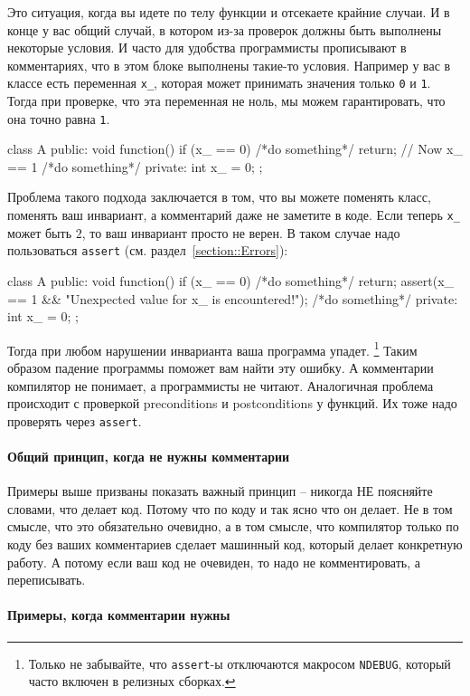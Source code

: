 Это ситуация, когда вы идете по телу функции и отсекаете крайние случаи.
И в конце у вас общий случай, в котором из-за проверок должны быть выполнены некоторые условия.
И часто для удобства программисты прописывают в комментариях, что в этом блоке выполнены такие-то условия.
Например у вас в классе есть переменная \verb"x_", которая может принимать значения только \verb"0" и \verb"1".
Тогда при проверке, что эта переменная не ноль, мы можем гарантировать, что она точно равна \verb"1".
\begin{cppcode}
class A {
public:
  void function() {
    if (x_ == 0) {
      /*do something*/
      return;
    }
    // Now x_ == 1
    /*do something*/
  }
private:
  int x_ = 0;
};
\end{cppcode}
Проблема такого подхода заключается в том, что вы можете поменять класс, поменять ваш инвариант, а комментарий даже не заметите в коде.
Если теперь \verb"x_" может быть $2$, то ваш инвариант просто не верен.
В таком случае надо пользоваться \verb"assert" (см. раздел~\ref{section::Errors}):
\begin{cppcode}
class A {
public:
  void function() {
    if (x_ == 0) {
      /*do something*/
      return;
    }
    assert(x_ == 1 && "Unexpected value for x_ is encountered!");
    /*do something*/
  }
private:
  int x_ = 0;
};
\end{cppcode}
Тогда при любом нарушении инварианта ваша программа упадет.%
\footnote{Только не забывайте, что \texttt{assert}-ы отключаются макросом \texttt{NDEBUG}, который часто включен в релизных сборках.}
Таким образом падение программы поможет вам найти эту ошибку.
А комментарии компилятор не понимает, а программисты не читают.
Аналогичная проблема происходит с проверкой preconditions и postconditions у функций.
Их тоже надо проверять через \verb"assert".

\paragraph{Общий принцип, когда не нужны комментарии}

Примеры выше призваны показать важный принцип -- никогда НЕ поясняйте словами, что делает код.
Потому что по коду и так ясно что он делает.
Не в том смысле, что это обязательно очевидно, а в том смысле, что компилятор только по коду без ваших комментариев сделает машинный код, который делает конкретную работу.
А потому если ваш код не очевиден, то надо не комментировать, а переписывать.

\paragraph{Примеры, когда комментарии нужны}

